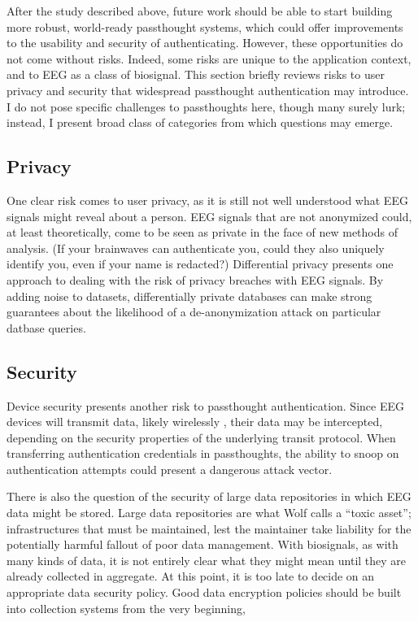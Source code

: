 \documentclass[sigconf]{acmart}
\begin{document}
After the study described above, future work should be able to start building more robust, world-ready passthought systems,
which could offer improvements to the usability and security of authenticating.
However, these opportunities do not come without risks. 
Indeed, some risks are unique to the application context, and to EEG as a class of biosignal. 
This section briefly reviews risks to user privacy and security that widespread passthought authentication may introduce. 
I do not pose specific challenges to passthoughts here, though many surely lurk; instead, I present broad class of categories from which questions may emerge. 

\subsection{Privacy}
\label{sec:org3b2cea6}
One clear risk comes to user privacy, as it is still not well understood what EEG signals might reveal about a person.
EEG signals that are not anonymized could, at least theoretically, come to be seen as private in the face of new methods of analysis.
(If your brainwaves can authenticate you, could they also uniquely identify you, even if your name is redacted?)
Differential privacy \cite{Dwork2014} presents one approach to dealing with the risk of privacy breaches with EEG signals.
By adding noise to datasets, differentially private databases can make strong guarantees about the likelihood of a de-anonymization attack on particular datbase queries.

\subsection{Security}
\label{sec:org7d15f96}
Device security presents another risk to passthought authentication.
Since EEG devices will transmit data, likely wirelessly \cite{Mihajlovic2015}, their data may be intercepted, depending on the security properties of the underlying transit protocol. 
When transferring authentication credentials in passthoughts, the ability to snoop on authentication attempts could present a dangerous attack vector.

There is also the question of the security of large data repositories in which EEG data might be stored.
Large data repositories are what Wolf \cite{Wolf2010} calls a ``toxic asset''; infrastructures that must be maintained, lest the maintainer take liability for the potentially harmful fallout of poor data management.
With biosignals, as with many kinds of data, it is not entirely clear what they might mean until they are already collected in aggregate. 
At this point, it is too late to decide on an appropriate data security policy.
Good data encryption policies should be built into collection systems from the very beginning, 
\end{document}
